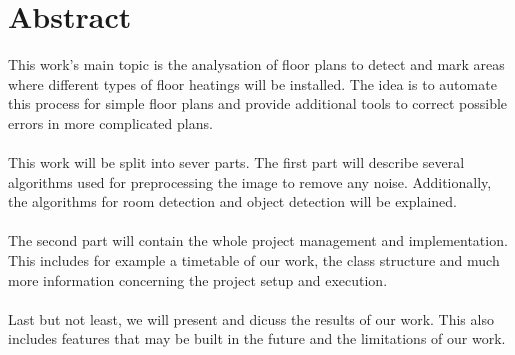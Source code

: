 \section{Abstract}
This work's main topic is the analysation of floor plans to detect and mark areas where different types of floor heatings will be installed. The idea is to automate this process for simple floor plans and provide additional tools to correct possible errors in more complicated plans.
\\\\
This work will be split into sever parts. The first part will describe several algorithms used for preprocessing the image to remove any noise. Additionally, the algorithms for room detection and object detection will be explained.
\\\\
The second part will contain the whole project management and implementation. This includes for example a timetable of our work, the class structure and much more information concerning the project setup and execution.
\\\\
Last but not least, we will present and dicuss the results of our work. This also includes features that may be built in the future and the limitations of our work.  